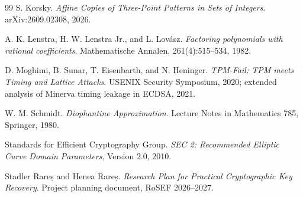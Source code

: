\documentclass[11pt,a4paper]{article}
\begin{document}
\begin{thebibliography}{99}
S. Korsky.
\emph{Affine Copies of Three-Point Patterns in Sets of Integers}.
arXiv:2609.02308, 2026.

A. K. Lenstra, H. W. Lenstra Jr., and L. Lovász.
\emph{Factoring polynomials with rational coefficients}.
Mathematische Annalen, 261(4):515--534, 1982.

D. Moghimi, B. Sunar, T. Eisenbarth, and N. Heninger.
\emph{TPM-Fail: TPM meets Timing and Lattice Attacks}.
USENIX Security Symposium, 2020; extended analysis of Minerva timing leakage in ECDSA, 2021.

W. M. Schmidt.
\emph{Diophantine Approximation}.
Lecture Notes in Mathematics 785, Springer, 1980.

Standards for Efficient Cryptography Group.
\emph{SEC 2: Recommended Elliptic Curve Domain Parameters}, Version 2.0, 2010.

Stadler Rareș and Henea Rareș.
\emph{Research Plan for Practical Cryptographic Key Recovery}.
Project planning document, RoSEF 2026--2027.

\end{thebibliography}
\end{document}
